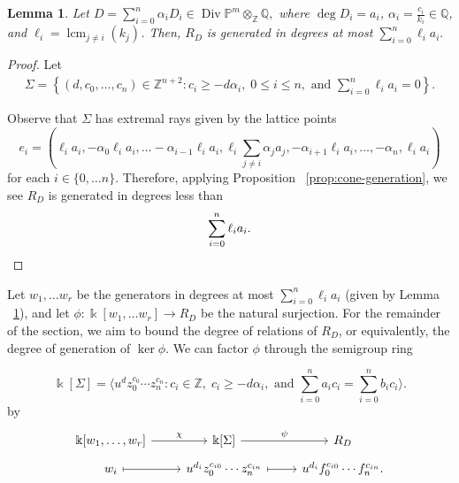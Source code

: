 \documentclass{amsart}
\theoremstyle{plain}
\newtheorem{lem}[thm]{Lemma}
\theoremstyle{definition}
\theoremstyle{remark}
\numberwithin{equation}{section}
\newcommand\bq{{\mathbb Q}}
\newcommand\bp{{\mathbb P}}
\newcommand\bz{{\mathbb Z}}
\newcommand\bk{{\Bbbk}}
\DeclareMathOperator\di{Div}
\newcommand\bida{a}
\newcommand\bidb{b}
\DeclareMathOperator{\lcm}{lcm}
\begin{document}
\begin{lem} \label{lem:proj-generators}
Let $D = \sum_{i=0}^{n} \alpha_i D_i \in \di \bp^m \otimes_\bz \bq,$ where
$\deg D_i = \bida_i$, $\alpha_i = \frac{c_i}{k_i}\in \bq$, and
$\ell_i = \lcm_{j \neq i} (k_j)$. Then, $R_D$ is generated in degrees at most $\sum_{i=0}^n \ell_i \bida_i.$
\end{lem}
\begin{proof}
Let 
\begin{align}\label{eqn:Sigma-defn}
	\Sigma = \left \{(d, c_0, \ldots, c_n) \in \bz^{n+2} \colon c_i \geq - d
\alpha_i, \; 0 \leq i \leq n, \text{ and } \sum_{i=0}^{n} \ell_i \bida_i = 0
\right \}.
\end{align}

Observe that $\Sigma$ has extremal rays given by the lattice points 
\begin{equation}\label{eqn:e-i-proj}
	e_i = \left(\ell_i \bida_i, - \alpha_0 \ell_i \bida_i, \ldots
-\alpha_{i-1} \ell_i \bida_i, \ell_i \sum_{j\ne i} \alpha_j \bida_j,
-\alpha_{i+1} \ell_i \bida_i, \ldots, -\alpha_n, \ell_i \bida_i \right)
\end{equation}
for each $i\in \{0, \ldots n\}$.
Therefore, applying Proposition ~\ref{prop:cone-generation}, we see $R_D$ is generated in degrees less than
\[
	\sum_{i=0}^n \ell_i \bida_i.
\qedhere
\]\end{proof}

Let $w_1, \ldots w_r$ be the generators in degrees at most $\sum_{i=0}^n \ell_i
\bida_i$ (given by Lemma ~\ref{lem:proj-generators}), and let 
$\phi \colon \bk[w_1, \ldots w_r] \to R_D$ be the natural surjection.
For the remainder of the section, we aim to bound the degree of relations
of $R_D$, or equivalently, the degree of generation of $\ker \phi$.
We can factor $\phi$ through the
semigroup ring 

\[
	\bk[\Sigma] =  \langle u^d z_0^{c_0} \cdots z_n^{c_n} \colon c_i \in
\bz, \; c_i \geq -d \alpha_i, \mbox{ and }\sum_{i=0}^{n} \bida_i c_i =
\sum_{i=0}^{n} \bidb_i c_i \rangle. 
\]
by
\begin{equation}
\label{eqn:factor-through-semigroup-ring}
\begin{tikzcd}[baseline=(current  bounding  box.center), row sep = tiny]
\bk[w_1,\ldots, w_r] \ar {r}{\chi} & \bk[\Sigma] \ar {r}{\psi} & R_D \\
w_i \ar[mapsto]{r} & u^{d_i}z_0^{c_{i0}} \cdots z_n^{c_{in}} \ar[mapsto]{r} & u^{d_i}f_0^{c_{i0}} \cdots f_n^{c_{in}}.
\end{tikzcd}
\end{equation}
\end{document}
